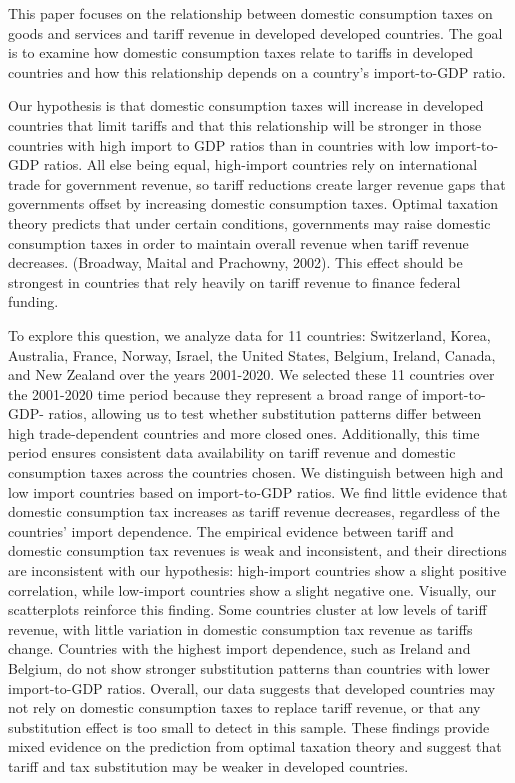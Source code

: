 \documentclass[12pt]{article}
\begin{document}
This paper focuses on the relationship between domestic consumption taxes on goods and services and tariff revenue in developed developed countries.  The goal is to examine how domestic consumption taxes relate to tariffs in developed countries and how this relationship depends on a country's import-to-GDP ratio.  

Our hypothesis is that domestic consumption taxes will increase in developed countries that  limit tariffs and that this relationship will be stronger in those countries with high import to GDP ratios than in countries with low import-to-GDP ratios.  All else being equal, high-import countries rely on international trade for government revenue, so tariff reductions create larger revenue gaps that governments offset by increasing domestic consumption taxes.  Optimal taxation theory predicts that under certain conditions, governments may raise domestic consumption taxes in order to maintain overall revenue when tariff revenue decreases. (Broadway, Maital and Prachowny, 2002).  This effect should be strongest in countries that rely heavily on tariff revenue to finance federal funding.

To explore this question, we analyze data for 11 countries: Switzerland, Korea, Australia, France, Norway, Israel, the United States, Belgium, Ireland, Canada, and New Zealand over the years 2001-2020.  We selected these 11 countries over the 2001-2020 time period because they represent a broad range of import-to-GDP- ratios, allowing us to test whether substitution patterns differ between high trade-dependent countries and more closed ones. Additionally, this time period ensures consistent data availability on tariff revenue and domestic consumption taxes across the countries chosen. We distinguish between high and low import countries based on import-to-GDP ratios.   We find little evidence that domestic consumption tax increases as tariff revenue decreases, regardless of the countries' import dependence. The empirical evidence between tariff and domestic consumption tax revenues is weak and inconsistent, and their directions are inconsistent with our hypothesis: high-import countries show a slight positive correlation, while low-import countries show a slight negative one.  Visually, our scatterplots reinforce this finding.  Some countries cluster at low levels of tariff revenue, with little variation in domestic consumption tax revenue as tariffs change.  Countries with the highest import dependence, such as Ireland and Belgium, do not show stronger substitution patterns than countries with lower import-to-GDP ratios.  Overall, our data suggests that developed countries may not rely on domestic consumption taxes to replace tariff revenue, or that any substitution effect is too small to detect in this sample.  These findings provide mixed evidence on the prediction from optimal taxation theory and suggest that tariff and tax substitution may be weaker in developed countries.
\end{document}
